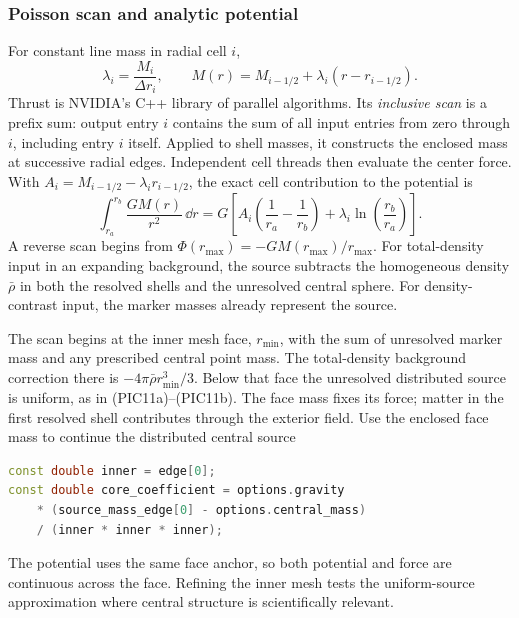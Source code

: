 \subsubsection{Poisson scan and analytic potential}

For constant line mass in radial cell \(i\),
\begin{equation}
 \lambda_i=\frac{M_i}{\Delta r_i},\qquad
 M(r)=M_{i-1/2}+\lambda_i(r-r_{i-1/2}).
\end{equation}
Thrust is NVIDIA's C++ library of parallel algorithms.  Its
\emph{inclusive scan} is a prefix sum: output entry \(i\) contains the sum of
all input entries from zero through \(i\), including entry \(i\) itself.
Applied to shell masses, it constructs the enclosed mass at successive radial
edges.  Independent cell threads then evaluate the center force.  With
\(A_i=M_{i-1/2}-\lambda_i r_{i-1/2}\), the exact cell contribution to the
potential is
\begin{equation}
 \int_{r_a}^{r_b}\frac{GM(r)}{r^2}\,\dd r
 =G\left[A_i\left(\frac1{r_a}-\frac1{r_b}\right)
 +\lambda_i\ln\!\left(\frac{r_b}{r_a}\right)\right].
\end{equation}
A reverse scan begins from
\(\Phi(r_{\max})=-GM(r_{\max})/r_{\max}\). For total-density input in an
expanding background, the source subtracts the homogeneous density
\(\bar\rho\) in both the resolved shells and the unresolved central sphere.
For density-contrast input, the marker masses already represent the source.

The scan begins at the inner mesh face, \(r_{\min}\), with the sum of
unresolved marker mass and any prescribed central point mass. The
total-density background correction there is
\(-4\pi\bar\rho r_{\min}^3/3\). Below that face the unresolved distributed
source is uniform, as in (PIC11a)--(PIC11b). The face mass fixes its force;
matter in the first resolved shell contributes through the exterior field.
{}
{Use the enclosed face mass to continue the distributed central source}
\begin{lstlisting}[language=C++]
const double inner = edge[0];
const double core_coefficient = options.gravity
    * (source_mass_edge[0] - options.central_mass)
    / (inner * inner * inner);
\end{lstlisting}
The potential uses the same face anchor, so both potential and force are
continuous across the face. Refining the inner mesh tests the uniform-source
approximation where central structure is scientifically relevant.

